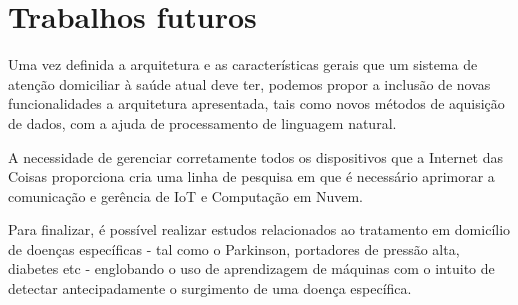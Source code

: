 \section{Trabalhos futuros} \label{sec:trabalhos-futuros}

Uma vez definida a arquitetura e as características gerais que um sistema de
atenção domiciliar à saúde atual deve ter, podemos propor a inclusão de
novas funcionalidades a arquitetura apresentada, tais como novos métodos
de aquisição de dados, com a ajuda de processamento de linguagem natural.

A necessidade de gerenciar corretamente todos os dispositivos que a Internet
das Coisas proporciona cria uma linha de pesquisa em que é necessário aprimorar
a comunicação e gerência de IoT e Computação em Nuvem.

Para finalizar, é possível realizar estudos relacionados ao tratamento em domicílio de
doenças específicas - tal como o Parkinson, portadores de pressão alta,
diabetes etc - englobando o uso de aprendizagem de máquinas com o intuito de detectar
antecipadamente o surgimento de uma doença específica.

